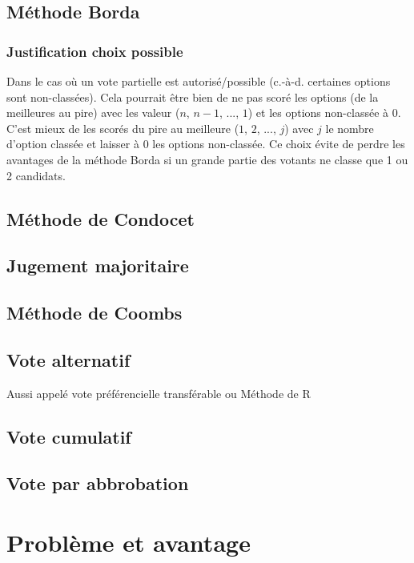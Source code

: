 \documentclass[../report]{subfiles}
\begin{document}
  \section{Méthode Borda}

  \subsection{Justification choix possible}

  Dans le cas où un vote partielle est autorisé/possible (c.-à-d. certaines options sont 
  non-classées).
  Cela pourrait être bien de ne pas scoré les options (de la meilleures au pire)
  avec les valeur ($n$, $n-1$, ..., $1$) et les options non-classée à $0$.
  C'est mieux de les scorés du pire au meilleure ($1$, $2$, ..., $j$) avec $j$ le nombre
  d'option classée et laisser à $0$ les options non-classée.
  Ce choix évite de perdre les avantages de la méthode Borda si un grande partie des votants
  ne classe que 1 ou 2 candidats.
  \cite{emerson_original_2013}
  
  \section{Méthode de Condocet}
  \todo{}
  \section{Jugement majoritaire}
  \todo{}
  \section{Méthode de Coombs}
  \todo{}
  \section{Vote alternatif}
  Aussi appelé vote préférencielle transférable ou Méthode de R
  \todo{}
  \section{Vote cumulatif}
  \todo{}
  \section{Vote par abbrobation}
  \todo{}


  \chapter{Problème et avantage}
  
\end{document}
